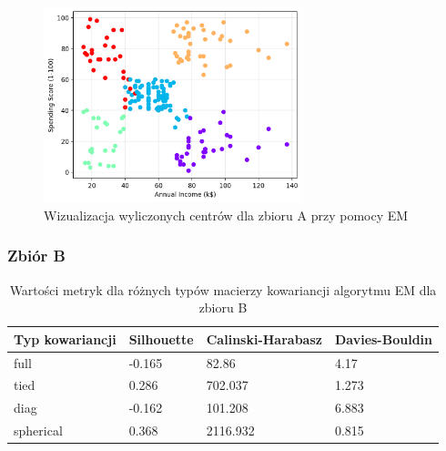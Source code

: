 \documentclass[a4paper,11pt]{article}
\begin{document}
\begin{figure}[H]
    \centering
    \includegraphics[width=0.67\textwidth]{images2/EM/mall/EM_Customer_xAnnualIncome_ySpendingScore.png}
    \caption{Wizualizacja wyliczonych centrów dla zbioru A przy pomocy EM}
    \label{fig:em_a_1}
\end{figure}

\subsubsection*{Zbiór B}

\begin{table}[H]
    \centering
    \begin{tabular}{|l|l|l|l|}
    \hline
    \textbf{Typ kowariancji} & \textbf{Silhouette} & \textbf{Calinski-Harabasz} & \textbf{Davies-Bouldin} \\ \hline
    full                     & -0.165              & 82.86                      & 4.17                    \\ \hline
    tied                     & 0.286               & 702.037                    & 1.273                   \\ \hline
    diag                     & -0.162              & 101.208                    & 6.883                   \\ \hline
    spherical                & 0.368               & 2116.932                   & 0.815                   \\ \hline
    \end{tabular}
    \caption{Wartości metryk dla różnych typów macierzy kowariancji algorytmu EM dla zbioru B}
    \label{tab:em_b_cov}
\end{table}
\end{document}
